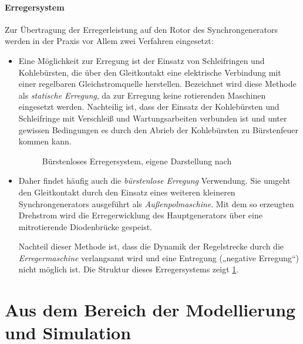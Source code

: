 \paragraph{Erregersystem}
Zur Übertragung der Erregerleistung auf den Rotor des Synchrongenerators werden in der Praxis vor Allem zwei Verfahren eingesetzt:\begin{itemize}
    \item Eine Möglichkeit zur Erregung ist der Einsatz von Schleifringen und Kohlebürsten, die über den Gleitkontakt eine elektrische Verbindung mit einer regelbaren Gleichstromquelle herstellen. Bezeichnet wird diese Methode als \emph{statische Erregung}, da zur Erregung keine rotierenden Maschinen eingesetzt werden. Nachteilig ist, dass der Einsatz der Kohlebürsten und Schleifringe mit Verschleiß und Wartungsarbeiten verbunden ist und unter gewissen Bedingungen es durch den Abrieb der Kohlebürsten zu Bürstenfeuer kommen kann.
    \begin{figure}
        \centering
        
        \caption{Bürstenloses Erregersystem, eigene Darstellung nach \cite[S. 557]{mullerGrundlagenElektrischerMaschinen2005}}
        \label{fig:burstenloseErregung}
    \end{figure}
    \item Daher findet häufig auch die \emph{bürstenlose Erregung} Verwendung. Sie umgeht den Gleitkontakt durch den Einsatz eines weiteren kleineren Synchrongenerators ausgeführt als \emph{Außenpolmaschine}. Mit dem so erzeugten Drehstrom wird die Erregerwicklung des Hauptgenerators über eine mitrotierende Diodenbrücke gespeist. 
    
    Nachteil dieser Methode ist, dass die Dynamik der Regelstrecke durch die \emph{Erregermaschine} verlangsamt wird und eine Entregung („negative Erregung“) nicht möglich ist. Die Struktur dieses Erregersystems zeigt \cref{fig:burstenloseErregung}. 
\end{itemize}

\section{Aus dem Bereich der Modellierung und Simulation}
\label{sec:GrundlagenModellierung}

